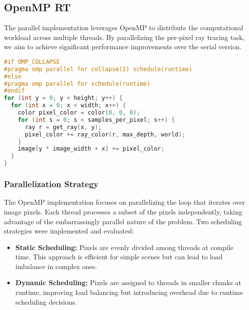 \subsection{OpenMP RT}
\label{subsec:openmp-rt}
The parallel implementation leverages OpenMP to distribute the computational workload across multiple threads. By parallelizing the per-pixel ray tracing task, we aim to achieve significant performance improvements over the serial version.

\begin{lstlisting}[caption={\textbf{OpenMP RT:} This parallelized implementation uses OpenMP to distribute pixel computations across multiple threads. The \texttt{\#pragma omp parallel for} directive enables efficient workload distribution, with optional loop collapsing (\texttt{collapse(2)}) for combining nested loops. The scheduling policy is configurable at runtime, allowing flexible tuning to balance performance and overhead.}, label={listing:openmp-rt}, name=openmp-rt, float=htbp, style=mystyle, language=C++]
#if OMP_COLLAPSE
#pragma omp parallel for collapse(2) schedule(runtime)
#else
#pragma omp parallel for schedule(runtime)
#endif
for (int y = 0; y < height; y++) {
  for (int x = 0; x < width; x++) {
    color pixel_color = color(0, 0, 0);
    for (int s = 0; s < samples_per_pixel; s++) {
      ray r = get_ray(x, y);
      pixel_color += ray_color(r, max_depth, world);
    }
    image[y * image_width + x] += pixel_color;
  }
}
\end{lstlisting}

\subsubsection{Parallelization Strategy}
The OpenMP implementation focuses on parallelizing the loop that iterates over image pixels. Each thread processes a subset of the pixels independently, taking advantage of the embarrassingly parallel nature of the problem. Two scheduling strategies were implemented and evaluated:

\begin{itemize}
    \item \textbf{Static Scheduling:} Pixels are evenly divided among threads at compile time. This approach is efficient for simple scenes but can lead to load imbalance in complex ones.
    \item \textbf{Dynamic Scheduling:} Pixels are assigned to threads in smaller chunks at runtime, improving load balancing but introducing overhead due to runtime scheduling decisions.
\end{itemize}

